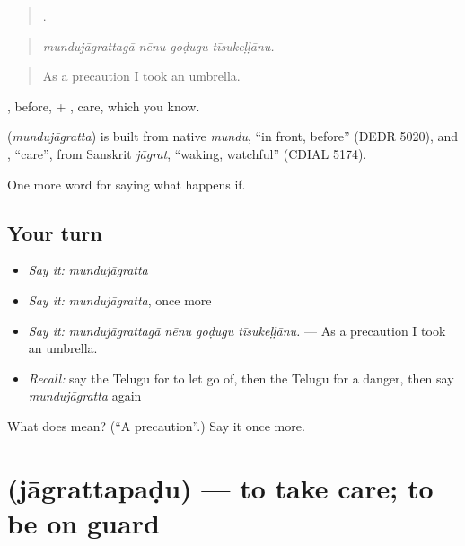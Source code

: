 \begin{quote}
   .
\end{quote}

\begin{quote}
\emph{mundujāgrattagā nēnu goḍugu tīsukeḷḷānu.}
\end{quote}

\begin{quote}
As a precaution I took an umbrella.
\end{quote}

, before, + , care, which you know.

\begin{cousinweb}
\textbf{} (\emph{mundujāgratta}) is built from native \emph{mundu}, \textquotedblleft{}in front, before\textquotedblright{} (DEDR 5020), and , \textquotedblleft{}care\textquotedblright{}, from Sanskrit \emph{jāgrat}, \textquotedblleft{}waking, watchful\textquotedblright{} (CDIAL 5174).
\end{cousinweb}

\begin{grammarlens}[title={What you've built}]
One more word for saying what happens if.
\end{grammarlens}

\subsection*{Your turn}
\begin{itemize}
\raggedright
  \item \emph{Say it:} \emph{mundujāgratta}
  \item \emph{Say it:} \emph{mundujāgratta}, once more
  \item \emph{Say it:} \emph{mundujāgrattagā nēnu goḍugu tīsukeḷḷānu.} — As a precaution I took an umbrella.
  \item \emph{Recall:} say the Telugu for to let go of, then the Telugu for a danger, then say \emph{mundujāgratta} again
\end{itemize}

\begin{tcolorbox}[breakable,colback=teal!4,colframe=teal!35!black,title={Before you move on}]
What does  mean? (\textquotedblleft{}A precaution\textquotedblright{}.) Say it once more.
\end{tcolorbox}
\section[\texorpdfstring{\te{జాగ్రత్తపడు} (jāgrattapaḍu)}{జాగ్రత్తపడు (jāgrattapaḍu)}]{ (jāgrattapaḍu) — to take care; to be on guard}

